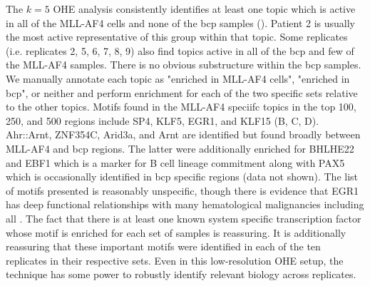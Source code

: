 The $k=5$ OHE analysis consistently identifies at least one topic which is active in all of the MLL-AF4 cells and none of the \gls{bcp} samples (). Patient 2 is usually the most active representative of this group within that topic. Some replicates (i.e. replicates 2, 5, 6, 7, 8, 9) also find topics active in all of the \gls{bcp} and few of the MLL-AF4 samples. There is no obvious substructure within the \gls{bcp} samples.  We manually annotate each topic as "enriched in MLL-AF4 cells", "enriched in \gls{bcp}", or neither and perform enrichment for each of the two specific sets relative to the other topics.  Motifs found in the MLL-AF4 speciifc topics in the top 100, 250, and 500 regions include SP4, KLF5, EGR1, and KLF15 (B, C, D). Ahr::Arnt, ZNF354C, Arid3a, and Arnt are identified but found broadly between MLL-AF4 and \gls{bcp} regions.  The latter were additionally enriched for BHLHE22 and EBF1 which is a marker for B cell lineage commitment \cite{Infante2013} along with PAX5 which is occasionally identified in \gls{bcp} specific regions (data not shown). The list of motifs presented is reasonably unspecific, though there is evidence that EGR1 has deep functional relationships with many hematological malignancies including \gls{all} \cite{Tian2016}. The fact that there is at least one known system specific transcription factor whose motif is enriched for each set of samples is reassuring.  It is additionally reassuring that these important motifs were identified in each of the ten replicates in their respective sets.  Even in this low-resolution OHE setup, the technique has some power to robustly identify relevant biology across replicates.

